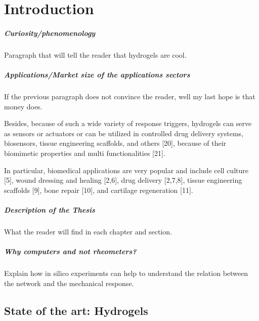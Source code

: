 \chapter{Introduction}\label{ch1:Intro}


\paragraph{Curiosity/phenomenology} Paragraph that will tell the reader that hydrogels are cool.

\paragraph{Applications/Market size of the applications sectors} If the previous paragraph does not convince the reader, well my last hope is that money does.

Besides, because of such a wide variety of response triggers, hydrogels can serve as sensors or actuators or can be utilized in controlled drug delivery systems, biosensors, tissue engineering scaffolds, and others [20], because of their biomimetic properties and multi functionalities [21]\citep{bustamantetorresHydrogelsClassificationAccording2021}.

In particular, biomedical applications are very popular and include cell culture [5], wound dressing and healing [2,6], drug delivery [2,7,8], tissue engineering scaffolds [9], bone repair [10], and cartilage regeneration [11]\citep{picchioniHydrogelsBasedDynamic2018}. 
 

\paragraph{Description of the Thesis} What the reader will find in each chapter and section.

\paragraph{Why computers and not rheometers?} Explain how in silico experiments can help to understand the relation between the network and the mechanical response.

\section{State of the art: Hydrogels}\label{ch1:StateArt}

